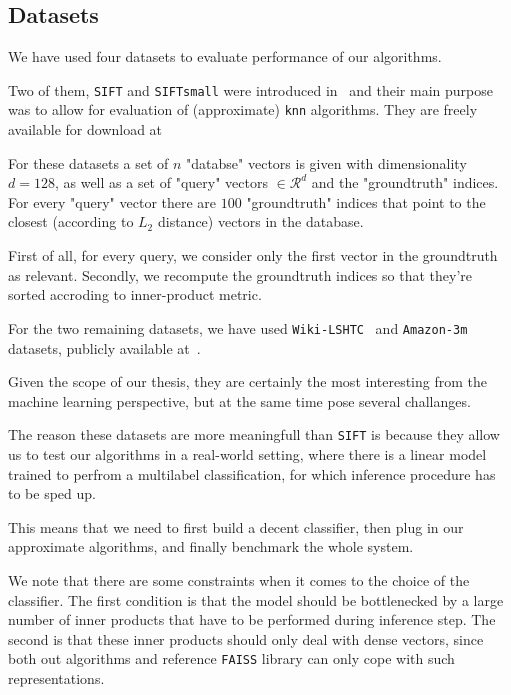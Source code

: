     \subsection{Datasets}\label{subsec:datasets}

        We have used four datasets to evaluate performance of our algorithms.

        Two of them, \texttt{SIFT} and \texttt{SIFTsmall} were introduced in~\cite{jegou2011product} and their
        main purpose was to allow for evaluation of (approximate) \texttt{knn} algorithms. They are freely
        available for download at~\cite{sift}

        For these datasets a set of $n$ "databse" vectors is given with dimensionality
        $d=128$, as well as a set of "query" vectors $\in \mathcal{R}^d$
        and the "groundtruth" indices. For every "query" vector there are $100$ "groundtruth" indices
        that point to the closest (according to $L_2$ distance) vectors in the database.

        First of all, for every query, we consider only the first vector in the groundtruth as relevant.
        Secondly, we recompute the groundtruth indices so that they're sorted accroding to inner-product
        metric.

        For the two remaining datasets, we have used \texttt{Wiki-LSHTC}~\cite{lshtc} and
        \texttt{Amazon-3m}~\cite{a3m} datasets, publicly available at~\cite{exrepo}.

        Given the scope of our thesis, they are certainly the most interesting from the machine learning perspective,
        but at the same time pose several challanges.

        The reason these datasets are more meaningfull than \texttt{SIFT} is because they allow us to test our
        algorithms in a real-world setting, where there is a linear model trained to perfrom a multilabel
        classification, for which inference procedure has to be sped up.

        This means that we need to first build a decent classifier, then plug in our approximate algorithms,
        and finally benchmark the whole system.

        We note that there are some constraints when it comes to the choice of the classifier. The first condition
        is that the model should be bottlenecked by a large number of inner products that have to be performed during
        inference step. The second is that these inner products should only deal with dense vectors, since both
        out algorithms and reference \texttt{FAISS} library can only cope with such representations.

